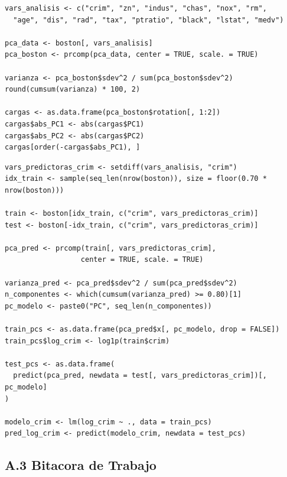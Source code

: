 \documentclass[10pt,a4paper]{article}
\begin{document}
\begin{lstlisting}[caption={PCA sobre variables estandarizadas.}]
vars_analisis <- c("crim", "zn", "indus", "chas", "nox", "rm",
  "age", "dis", "rad", "tax", "ptratio", "black", "lstat", "medv")

pca_data <- boston[, vars_analisis]
pca_boston <- prcomp(pca_data, center = TRUE, scale. = TRUE)

varianza <- pca_boston$sdev^2 / sum(pca_boston$sdev^2)
round(cumsum(varianza) * 100, 2)

cargas <- as.data.frame(pca_boston$rotation[, 1:2])
cargas$abs_PC1 <- abs(cargas$PC1)
cargas$abs_PC2 <- abs(cargas$PC2)
cargas[order(-cargas$abs_PC1), ]
\end{lstlisting}

\begin{lstlisting}[caption={Prediccion de criminalidad con componentes principales.}]
vars_predictoras_crim <- setdiff(vars_analisis, "crim")
idx_train <- sample(seq_len(nrow(boston)), size = floor(0.70 * nrow(boston)))

train <- boston[idx_train, c("crim", vars_predictoras_crim)]
test <- boston[-idx_train, c("crim", vars_predictoras_crim)]

pca_pred <- prcomp(train[, vars_predictoras_crim],
                  center = TRUE, scale. = TRUE)

varianza_pred <- pca_pred$sdev^2 / sum(pca_pred$sdev^2)
n_componentes <- which(cumsum(varianza_pred) >= 0.80)[1]
pc_modelo <- paste0("PC", seq_len(n_componentes))

train_pcs <- as.data.frame(pca_pred$x[, pc_modelo, drop = FALSE])
train_pcs$log_crim <- log1p(train$crim)

test_pcs <- as.data.frame(
  predict(pca_pred, newdata = test[, vars_predictoras_crim])[, pc_modelo]
)

modelo_crim <- lm(log_crim ~ ., data = train_pcs)
pred_log_crim <- predict(modelo_crim, newdata = test_pcs)
\end{lstlisting}

\subsection*{A.3 Bitacora de Trabajo}
\end{document}
